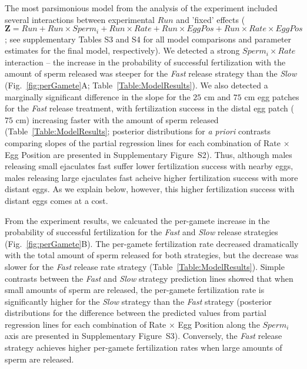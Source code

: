 \documentclass{article}
\begin{document}
	The most parsimonious model from the analysis of the  experiment included several interactions between experimental $Run$ and 'fixed' effects ($\mathbf{Z} = Run + Run \times Sperm_i + Run \times Rate + Run \times EggPos + Run \times Rate \times EggPos$; see supplementary Tables S3 and S4 for all model comparisons and parameter estimates for the final model, respectively). We detected a strong $Sperm_i \times Rate$ interaction -- the increase in the probability of successful fertilization with the amount of sperm released was steeper for the \textit{Fast} release strategy than the \textit{Slow} (Fig.~\ref{fig:perGamete}A; Table~\ref{Table:ModelResults}). We also detected a marginally significant difference in the slope for the $25$ cm and $75$ cm egg patches for the \textit{Fast} release treatment, with fertilization success in the distal egg patch ($75$ cm) increasing faster with the amount of sperm released (Table~\ref{Table:ModelResults}; posterior distributions for \textit{a priori} contrasts comparing slopes of the partial regression lines for each combination of Rate $\times$ Egg Position are presented in Supplementary Figure~S2). Thus, although males releasing small ejaculates fast suffer lower fertilization success with nearby eggs, males releasing large ejaculates fast acheive higher fertilization success with more distant eggs. As we explain below, however, this higher fertilization success with distant eggs comes at a cost.

	From the  experiment results, we calcuated the per-gamete increase in the probability of successful fertilization for the \textit{Fast} and \textit{Slow} release strategies (Fig.~\ref{fig:perGamete}B). The per-gamete fertilization rate decreased dramatically with the total amount of sperm released for both strategies, but the decrease was slower for the \textit{Fast} release rate strategy (Table~\ref{Table:ModelResults}). Simple contrasts between the \textit{Fast} and \textit{Slow} strategy prediction lines showed that when small amounts of sperm are released, the per-gamete fertilization rate is significantly higher for the \textit{Slow} strategy than the \textit{Fast} strategy (posterior distributions for the difference between the predicted values from partial regression lines for each combination of Rate $\times$ Egg Position along the $Sperm_i$ axis are presented in Supplementary Figure~S3). Conversely, the \textit{Fast} release strategy achieves higher per-gamete fertilization rates when large amounts of sperm are released.
\end{document}
